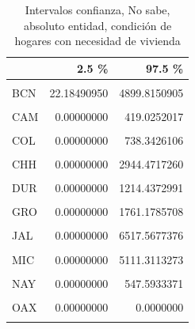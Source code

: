 \documentclass[
]{article}
\begin{document}
\begin{table}[H]

\caption{\label{tab:unnamed-chunk-20}Intervalos confianza, No sabe, absoluto entidad,
    condición de hogares con necesidad de vivienda}
\centering
\begin{tabular}[t]{lrr}
\toprule
  & 2.5 \% & 97.5 \%\\
\midrule
\cellcolor{gray!6}{AGU} & \cellcolor{gray!6}{138.56997914} & \cellcolor{gray!6}{2003.4300209}\\
BCN & 22.18490950 & 4899.8150905\\
\cellcolor{gray!6}{BCS} & \cellcolor{gray!6}{0.00000000} & \cellcolor{gray!6}{0.0000000}\\
CAM & 0.00000000 & 419.0252017\\
\cellcolor{gray!6}{COA} & \cellcolor{gray!6}{11.46079047} & \cellcolor{gray!6}{3672.5392095}\\
\addlinespace
COL & 0.00000000 & 738.3426106\\
\cellcolor{gray!6}{CHP} & \cellcolor{gray!6}{0.00000000} & \cellcolor{gray!6}{4706.9123403}\\
CHH & 0.00000000 & 2944.4717260\\
\cellcolor{gray!6}{CMX} & \cellcolor{gray!6}{0.00000000} & \cellcolor{gray!6}{8022.0403745}\\
DUR & 0.00000000 & 1214.4372991\\
\addlinespace
\cellcolor{gray!6}{GUA} & \cellcolor{gray!6}{460.51344642} & \cellcolor{gray!6}{8475.4865536}\\
GRO & 0.00000000 & 1761.1785708\\
\cellcolor{gray!6}{HID} & \cellcolor{gray!6}{0.00000000} & \cellcolor{gray!6}{1908.1980659}\\
JAL & 0.00000000 & 6517.5677376\\
\cellcolor{gray!6}{MEX} & \cellcolor{gray!6}{85.87632281} & \cellcolor{gray!6}{15410.1236772}\\
\addlinespace
MIC & 0.00000000 & 5111.3113273\\
\cellcolor{gray!6}{MOR} & \cellcolor{gray!6}{0.00000000} & \cellcolor{gray!6}{1077.4268904}\\
NAY & 0.00000000 & 547.5933371\\
\cellcolor{gray!6}{NLE} & \cellcolor{gray!6}{0.00000000} & \cellcolor{gray!6}{4558.8596474}\\
OAX & 0.00000000 & 0.0000000\\
\addlinespace
\cellcolor{gray!6}{PUE} & \cellcolor{gray!6}{0.00000000} & \cellcolor{gray!6}{2394.6108635}\\

\end{tabular}
\end{table}
\end{document}
